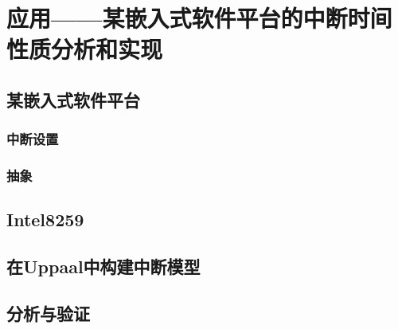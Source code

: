 
\chapter{应用——某嵌入式软件平台的中断时间性质分析和实现}

\section{某嵌入式软件平台}
\subsection{中断设置}
\subsection{抽象}

\section{Intel8259}

\section{在Uppaal中构建中断模型}

\section{分析与验证}